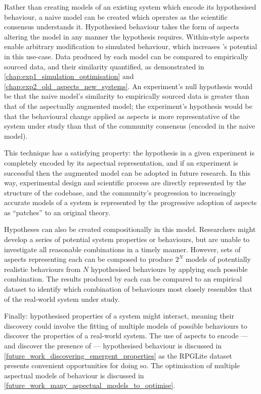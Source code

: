 Rather than creating models of an existing system which encode its hypothesised
behaviour, a naive model can be created which operates as the scientific
consensus understands it. Hypothesised behaviour takes the form of aspects
altering the model in any manner the hypothesis requires. Within-style aspects
enable arbitrary modification to simulated behaviour, which increases \aop{}'s
potential in this use-case. Data produced by each model can be compared to
empirically sourced data, and their similarity quantified, as demonstrated in
\cref{chap:exp1_simulation_optimisation} and
\cref{chap:exp2_old_aspects_new_systems}. An experiment's null hypothesis would
be that the naive model's similarity to empirically sourced data is greater than
that of the aspectually augmented model; the experiment's hypothesis would be
that the behavioural change applied as aspects is more representative of the
system under study than that of the community consensus (encoded in the naive model).

This technique has a satisfying property: the hypothesis in a given experiment is
completely encoded by its aspectual representation, and if an experiment is
successful then the augmented model can be adopted in future research. In this
way, experimental design and scientific process are directly represented by the
structure of the codebase, and the community's progression to increasingly
accurate models of a system is represented by the progressive adoption of
aspects as ``patches'' to an original theory.

Hypotheses can also be created compositionally in this model. Researchers might
develop a series of potential system properties or behaviours, but are unable to
investigate all reasonable combinations in a timely manner. However, sets of
aspects representing each can be composed to produce $2^N$ models of potentially
realistic behaviours from $N$ hypothesised behaviours by applying each possible
combination. The results produced by each can be compared to an empirical
dataset to identify which combination of behaviours most closely resembles that
of the real-world system under study.

Finally: hypothesised properties of a system might interact, meaning their
discovery could involve the fitting of multiple models of possible behaviours to
discover the properties of a real-world system. The use of aspects to encode ---
and discover the presence of --- hypothesised behaviour is discussed in
\cref{future_work_discovering_emergent_properties} as the RPGLite dataset
presents convenient opportunities for doing so. The optimisation of multiple
aspectual models of behaviour is discussed in
\cref{future_work_many_aspectual_models_to_optimise}.




